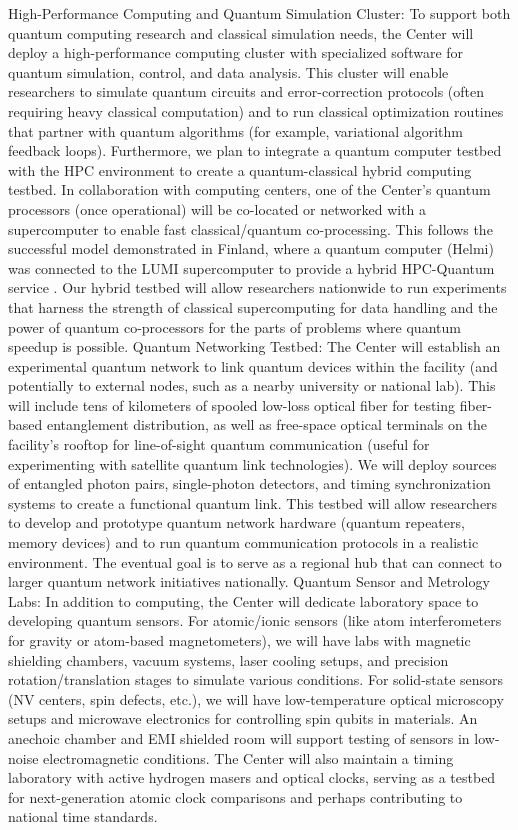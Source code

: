 \documentclass[12pt]{article}
\begin{document}
High-Performance Computing and Quantum Simulation Cluster: To support both quantum computing research and classical simulation needs, the Center will deploy a high-performance computing cluster with specialized software for quantum simulation, control, and data analysis. This cluster will enable researchers to simulate quantum circuits and error-correction protocols (often requiring heavy classical computation) and to run classical optimization routines that partner with quantum algorithms (for example, variational algorithm feedback loops). Furthermore, we plan to integrate a quantum computer testbed with the HPC environment to create a quantum-classical hybrid computing testbed. In collaboration with computing centers, one of the Center’s quantum processors (once operational) will be co-located or networked with a supercomputer to enable fast classical/quantum co-processing. This follows the successful model demonstrated in Finland, where a quantum computer (Helmi) was connected to the LUMI supercomputer to provide a hybrid HPC-Quantum service . Our hybrid testbed will allow researchers nationwide to run experiments that harness the strength of classical supercomputing for data handling and the power of quantum co-processors for the parts of problems where quantum speedup is possible.
Quantum Networking Testbed: The Center will establish an experimental quantum network to link quantum devices within the facility (and potentially to external nodes, such as a nearby university or national lab). This will include tens of kilometers of spooled low-loss optical fiber for testing fiber-based entanglement distribution, as well as free-space optical terminals on the facility’s rooftop for line-of-sight quantum communication (useful for experimenting with satellite quantum link technologies). We will deploy sources of entangled photon pairs, single-photon detectors, and timing synchronization systems to create a functional quantum link. This testbed will allow researchers to develop and prototype quantum network hardware (quantum repeaters, memory devices) and to run quantum communication protocols in a realistic environment. The eventual goal is to serve as a regional hub that can connect to larger quantum network initiatives nationally.
Quantum Sensor and Metrology Labs: In addition to computing, the Center will dedicate laboratory space to developing quantum sensors. For atomic/ionic sensors (like atom interferometers for gravity or atom-based magnetometers), we will have labs with magnetic shielding chambers, vacuum systems, laser cooling setups, and precision rotation/translation stages to simulate various conditions. For solid-state sensors (NV centers, spin defects, etc.), we will have low-temperature optical microscopy setups and microwave electronics for controlling spin qubits in materials. An anechoic chamber and EMI shielded room will support testing of sensors in low-noise electromagnetic conditions. The Center will also maintain a timing laboratory with active hydrogen masers and optical clocks, serving as a testbed for next-generation atomic clock comparisons and perhaps contributing to national time standards.
\end{document}
